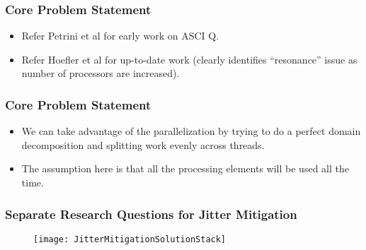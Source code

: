 \begin{frame}
\frametitle{Core Problem Statement}
\begin{itemize}
\item Refer Petrini et al for early work on ASCI Q.
\item Refer Hoefler  et al for up-to-date work  (clearly identifies ``resonance'' issue as number of processors are increased). 
\end{itemize}
\end{frame}

\begin{frame}
\frametitle{Core Problem Statement}
\begin{itemize}
\item We can take advantage of the parallelization by trying to do a
  perfect domain decomposition and splitting work evenly across
  threads. 
\item The assumption here is that all the processing elements will be used all the time. 
\end{itemize}
\end{frame}

\begin{frame}
\frametitle{Separate Research Questions for Jitter Mitigation}
  \begin{figure}
    \texttt{[image: JitterMitigationSolutionStack]}
  \end{figure}
\end{frame}

